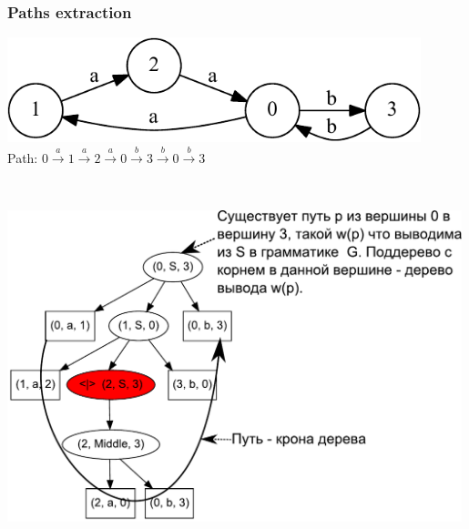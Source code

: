 \documentclass[xcolor=table,aspectratio=169]{beamer}
\begin{document}
\begin{frame}[fragile]
  \transwipe[direction=90]
  \frametitle{Paths extraction}
\begin{center}

\begin{minipage}{0.4\textwidth}
\includegraphics[width=0.9\textwidth]{pictures/input.pdf}
\\
Path: $0\xrightarrow{a}1\xrightarrow{a}2\xrightarrow{a}0\xrightarrow{b}3\xrightarrow{b}0\xrightarrow{b}3$
\end{minipage}
~
\begin{minipage} {0.57\textwidth}
\includegraphics[width=0.99\textwidth]{pictures/AnBn_2_m.pdf}
\end{minipage}

        
\end{center}                
\end{frame}
\end{document}
